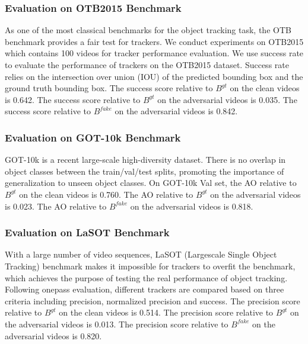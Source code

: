 \documentclass{article}
\begin{document}
\subsubsection{Evaluation on OTB2015 Benchmark}

As one of the most classical benchmarks for the object tracking task, the OTB benchmark provides a fair test for trackers. We conduct experiments on OTB2015 \cite{OTB} which contains 100 videos for tracker performance evaluation.
We use success rate to evaluate the performance of trackers on the OTB2015 dataset. Success rate relies on the intersection over union (IOU) of the predicted bounding box and the ground truth bounding box.
The success score relative to $B^{gt}$ on the clean videos is 0.642. The success score relative to $B^{gt}$ on the adversarial videos is 0.035. The success score relative to $B^{fake}$ on the adversarial videos is 0.842.

\subsubsection{Evaluation on GOT-10k Benchmark}

GOT-10k \cite{GOT-10k} is a recent large-scale high-diversity dataset. There is no overlap in object classes between the train/val/test splits, promoting the importance of generalization to unseen object classes.
On GOT-10k Val set, the AO relative to $B^{gt}$ on the clean videos is 0.760. The AO relative to $B^{gt}$ on the adversarial videos is 0.023. The AO relative to $B^{fake}$ on the adversarial videos is 0.818.

\subsubsection{Evaluation on LaSOT Benchmark}

With a large number of video sequences, LaSOT (Largescale Single Object Tracking) benchmark makes it impossible for trackers to overfit the benchmark, which achieves the purpose of testing the real performance of object tracking.
Following onepass evaluation, different trackers are compared based on three criteria including precision, normalized precision and success.
The precision score relative to $B^{gt}$ on the clean videos is 0.514. The precision score relative to $B^{gt}$ on the adversarial videos is 0.013. The precision score relative to $B^{fake}$ on the adversarial videos is 0.820.
\end{document}
